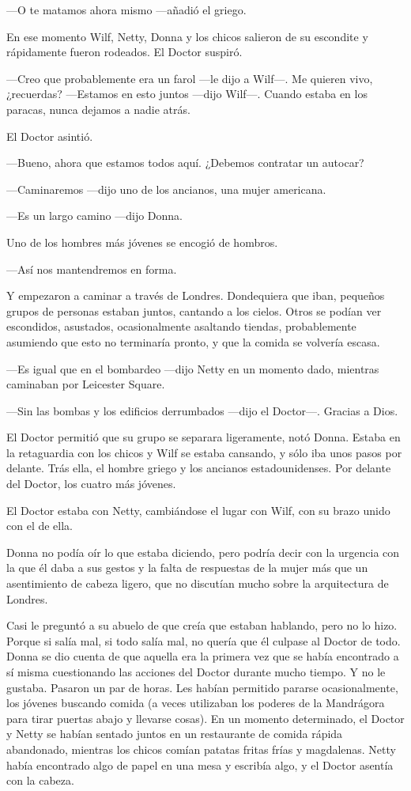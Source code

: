 ---O te matamos ahora mismo ---añadió el griego.

En ese momento Wilf, Netty, Donna y los chicos salieron de su escondite
y rápidamente fueron rodeados. El Doctor suspiró.

---Creo que probablemente era un farol ---le dijo a Wilf---. Me quieren
vivo, ¿recuerdas? ---Estamos en esto juntos ---dijo Wilf---. Cuando
estaba en los paracas, nunca dejamos a nadie atrás.

El Doctor asintió.

---Bueno, ahora que estamos todos aquí. ¿Debemos contratar un autocar?

---Caminaremos ---dijo uno de los ancianos, una mujer americana.

---Es un largo camino ---dijo Donna.

Uno de los hombres más jóvenes se encogió de hombros.

---Así nos mantendremos en forma.

Y empezaron a caminar a través de Londres. Dondequiera que iban,
pequeños grupos de personas estaban juntos, cantando a los cielos. Otros
se podían ver escondidos, asustados, ocasionalmente asaltando tiendas,
probablemente asumiendo que esto no terminaría pronto, y que la comida
se volvería escasa.

---Es igual que en el bombardeo ---dijo Netty en un momento dado,
mientras caminaban por Leicester Square.

---Sin las bombas y los edificios derrumbados ---dijo el Doctor---.
Gracias a Dios.

El Doctor permitió que su grupo se separara ligeramente, notó Donna.
Estaba en la retaguardia con los chicos y Wilf se estaba cansando, y
sólo iba unos pasos por delante. Trás ella, el hombre griego y los
ancianos estadounidenses. Por delante del Doctor, los cuatro más
jóvenes.

El Doctor estaba con Netty, cambiándose el lugar con Wilf, con su brazo
unido con el de ella.

Donna no podía oír lo que estaba diciendo, pero podría decir con la
urgencia con la que él daba a sus gestos y la falta de respuestas de la
mujer más que un asentimiento de cabeza ligero, que no discutían mucho
sobre la arquitectura de Londres.

Casi le preguntó a su abuelo de que creía que estaban hablando, pero no
lo hizo. Porque si salía mal, si todo salía mal, no quería que él
culpase al Doctor de todo. Donna se dio cuenta de que aquella era la
primera vez que se había encontrado a sí misma cuestionando las acciones
del Doctor durante mucho tiempo. Y no le gustaba. Pasaron un par de
horas. Les habían permitido pararse ocasionalmente, los jóvenes buscando
comida (a veces utilizaban los poderes de la Mandrágora para tirar
puertas abajo y llevarse cosas). En un momento determinado, el Doctor y
Netty se habían sentado juntos en un restaurante de comida rápida
abandonado, mientras los chicos comían patatas fritas frías y
magdalenas. Netty había encontrado algo de papel en una mesa y escribía
algo, y el Doctor asentía con la cabeza.


